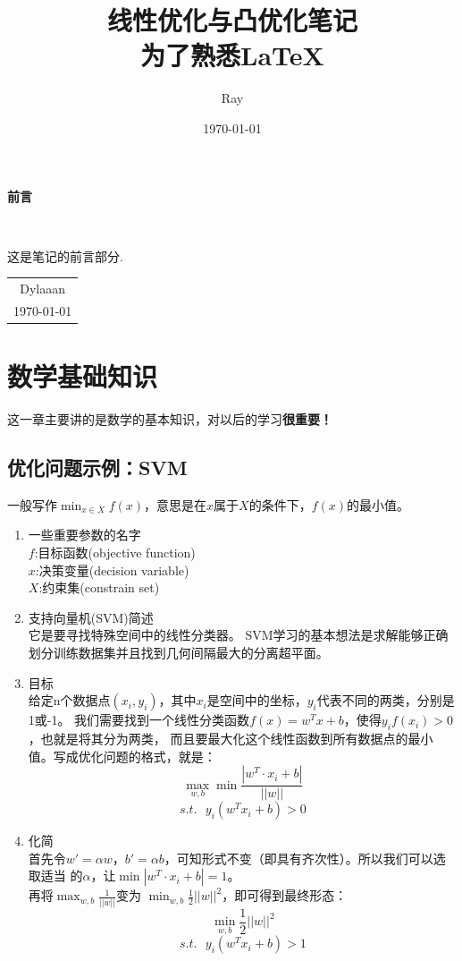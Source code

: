 \documentclass[12pt, a4paper, oneside]{ctexbook}
\title{{\Huge{\textbf{线性优化与凸优化笔记}}}\\为了熟悉LaTeX}
\author{Ray}
\date{\today}
\begin{document}
\maketitle

\setcounter{page}{1}

\begin{center}
    \Huge\textbf{前言}
\end{center}\

这是笔记的前言部分. 

\begin{flushright}
    \begin{tabular}{c}
        Dylaaan\\
        \today
    \end{tabular}
\end{flushright}

\newpage
{}
\setcounter{page}{1}
\tableofcontents
\newpage
\setcounter{page}{1}

\chapter{数学基础知识}

这一章主要讲的是数学的基本知识，对以后的学习\textbf{很重要！} 

\section{优化问题示例：SVM}
一般写作$\min_{x\in X}f(x)$，意思是在$x$属于$X$的条件下，$f(x)$的最小值。
\begin{enumerate}
    \item 一些重要参数的名字 \\
$f$:目标函数(objective function) \\ $x$:决策变量(decision variable) \\ $X$:约束集(constrain set)

    \item 支持向量机(SVM)简述 \\
它是要寻找特殊空间中的线性分类器。
SVM学习的基本想法是求解能够正确划分训练数据集并且找到几何间隔最大的分离超平面。

    \item 目标 \\
给定n个数据点$(x_i,y_i)$，其中$x_i$是空间中的坐标，$y_i$代表不同的两类，分别是1或-1。
我们需要找到一个线性分类函数$f(x)=w^Tx+b$，使得$y_if(x_i)>0$，也就是将其分为两类，
而且要最大化这个线性函数到所有数据点的最小值。写成优化问题的格式，就是：
$$\max_{w,b}\min \frac{|w^T\cdot x_i+b|}{||w||}$$
$$s.t.\text{ }y_i(w^Tx_i+b)>0$$

    \item 化简 \\
首先令$w'=\alpha w$，$b'=\alpha b$，可知形式不变（即具有齐次性）。所以我们可以选取适当
的$\alpha$，让$\min|w^T\cdot x_i+b| = 1$。\\ 再将$\max_{w,b}\frac{1}{||w||}$变为
$\min_{w,b}\frac{1}{2}||w||^2$，即可得到最终形态：
$$\min_{w,b}\frac{1}{2}||w||^2$$
$$s.t. \text{ }y_i(w^Tx_i+b)>1$$

\end{enumerate}
\end{document}

